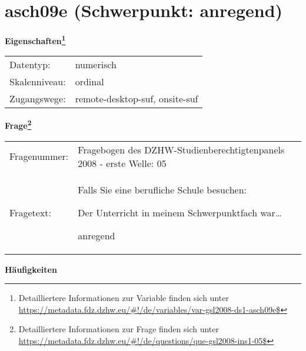 
    \setcounter{footnote}{0}

    \vspace*{-1.8cm}
	\section{asch09e (Schwerpunkt: anregend)}
	\label{section:asch09e}



    \vspace*{0.5cm}
    \noindent\textbf{Eigenschaften\footnote{Detailliertere Informationen zur Variable finden sich unter
		\url{https://metadata.fdz.dzhw.eu/\#!/de/variables/var-gsl2008-ds1-asch09e$}}}\\
	\begin{tabularx}{\hsize}{@{}lX}
	Datentyp: & numerisch \\
	Skalenniveau: & ordinal \\
	Zugangswege: &
	  remote-desktop-suf, 
	  onsite-suf
 \\
    \end{tabularx}



				\vspace*{0.5cm}
                \noindent\textbf{Frage\footnote{Detailliertere Informationen zur Frage finden sich unter
		              \url{https://metadata.fdz.dzhw.eu/\#!/de/questions/que-gsl2008-ins1-05$}}}\\
				\begin{tabularx}{\hsize}{@{}lX}
					Fragenummer: &
					  Fragebogen des DZHW-Studienberechtigtenpanels 2008 - erste Welle:
					  05
 \\
					Fragetext: & Falls Sie eine berufliche Schule besuchen:\par  Der Unterricht in meinem Schwerpunktfach war…\par  anregend \\
				\end{tabularx}





        		\vspace*{0.5cm}
                \noindent\textbf{Häufigkeiten}

